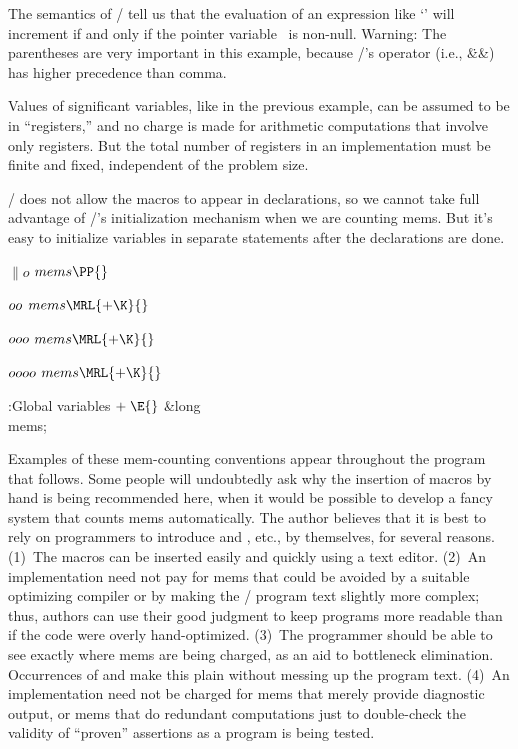 The semantics of \CEE/ tell us that the evaluation of an expression
like `' will increment  if
and only if the
pointer variable~ is non-null. Warning: The parentheses are very
important in this example, because \CEE/'s operator \PB{$\W$} (i.e.,
\.{\&\&}) has higher precedence than comma.

Values of significant variables, like  in the previous example,
can be assumed to be in ``registers,'' and no charge is made for
arithmetic computations that involve only registers. But the total
number of registers in an implementation must be finite and fixed,
independent of the problem size.

\CEE/ does not allow the  macros to appear in declarations, so we
cannot
take full advantage of \CEE/'s initialization mechanism when we are
counting mems. But it's easy to initialize variables in separate
statements after the declarations are done.

\Y\B\4\D$\|o$ \5
$\\{mems}\PP{}$\par
\B\4\D$\\{oo}$ \5
$\\{mems}\MRL{+{\K}}{}$\par
\B\4\D$\\{ooo}$ \5
$\\{mems}\MRL{+{\K}}{}$\par
\B\4\D$\\{oooo}$ \5
$\\{mems}\MRL{+{\K}}{}$\par
\Y\B\4:Global variables\X${}\mathrel+\E{}$\6
\&{long} \\{mems};\par
\fi

Examples of these mem-counting conventions appear throughout the
program that follows. Some people will undoubtedly ask why the insertion of
macros by hand is being recommended here, when it would be possible to
develop a fancy system that counts mems automatically. The author
believes that it is best to rely on programmers to introduce  and
, etc., by themselves, for several reasons. (1)~The macros can be
inserted easily and quickly using a text editor. (2)~An implementation
need not pay for mems that could be avoided by a suitable optimizing
compiler or by making the \CEE/ program text slightly more complex;
thus, authors can use their good judgment to keep programs more
readable than if the code were overly hand-optimized. (3)~The
programmer should be able to see exactly where mems are being charged,
as an aid to bottleneck elimination. Occurrences of  and 
make
this plain without messing up the program text. (4)~An implementation
need not be charged for mems that merely provide diagnostic output, or
mems that do redundant computations just to double-check the validity
of ``proven'' assertions as a program is being tested.

